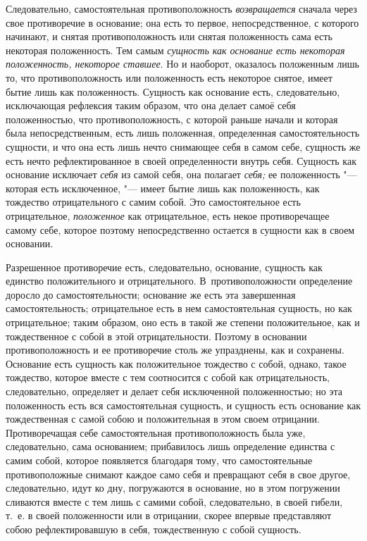 Следовательно, самостоятельная противоположность
{\em возвращается} сначала через свое противоречие в
основание; она есть то первое, непосредственное, с которого начинают, и
снятая противоположность или снятая положенность сама есть некоторая
положенность. Тем самым {\em сущность как основание
есть некоторая положенность, некоторое ставшее}. Но и наоборот, оказалось
положенным лишь то, что противоположность или положенность есть некоторое
снятое, имеет бытие лишь как положенность. Сущность как основание есть,
следовательно, исключающая рефлексия таким образом, что она делает самоё
себя положенностью, что противоположность, с которой раньше начали и
которая была непосредственным, есть лишь положенная, определенная
самостоятельность сущности, и что она есть лишь нечто снимающее себя в
самом себе, сущность же есть нечто рефлектированное в своей определенности
внутрь себя. Сущность как основание исключает
{\em себя} из самой себя, она полагает
{\em себя;} ее положенность "--- которая есть исключенное,
"--- имеет бытие лишь как положенность, как тождество отрицательного с самим
собой. Это самостоятельное есть отрицательное,
{\em положенное} как отрицательное, есть некое
противоречащее самому себе, которое поэтому непосредственно остается в
сущности как в своем основании.

Разрешенное противоречие есть, следовательно, основание, сущность как
единство положительного и отрицательного. В~противоположности определение
доросло до самостоятельности; основание же есть эта завершенная
самостоятельность; отрицательное есть в нем самостоятельная сущность, но
как отрицательное; таким образом, оно есть в такой же степени
положительное, как и тождественное с собой в этой отрицательности. Поэтому
в основании противоположность и ее противоречие столь же упразднены, как и
сохранены. Основание есть сущность как положительное тождество с собой,
однако, такое тождество, которое вместе с тем соотносится с собой как
отрицательность, следовательно, определяет и делает себя исключенной
положенностью; но эта положенность есть вся самостоятельная сущность, и
сущность есть основание как тождественная с самой собою и положительная в
этом своем отрицании. Противоречащая себе самостоятельная противоположность
была уже, следовательно, сама основанием; прибавилось лишь определение
единства с самим собой, которое появляется благодаря тому, что
самостоятельные противоположные снимают каждое само себя и превращают себя
в свое другое, следовательно, идут ко дну, погружаются в основание, но в
этом погружении сливаются вместе с тем лишь с самими собой, следовательно,
в своей гибели, т.~е. в своей положенности или в отрицании, скорее впервые
представляют собою рефлектировавшую в себя, тождественную с собой сущность.

